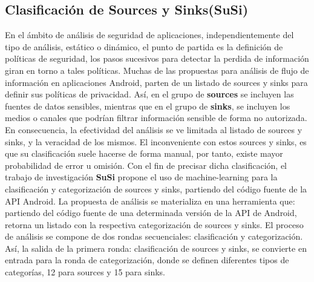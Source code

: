 \subsection{Clasificación de Sources y Sinks(SuSi)}
\label{sec:susi}
En el ámbito de análisis de seguridad de aplicaciones, independientemente del
tipo de análisis, estático o dinámico, el punto de partida es la definición de
políticas de seguridad, los pasos sucesivos para detectar la perdida de
información giran en torno a tales políticas.\newline
Muchas de las propuestas para análisis de flujo de información en aplicaciones
Android, parten de un listado de sources y sinks para definir sus políticas de
privacidad. Así, en el grupo de \textbf{sources} se incluyen las fuentes de
datos sensibles, mientras que en el grupo de \textbf{sinks}, se incluyen los
medios o canales que podrían filtrar información sensible de forma no autorizada. 
En consecuencia, la efectividad del análisis se ve limitada al listado de
sources y sinks, y la veracidad de los mismos. El inconveniente con estos sources y sinks, es que su
clasificación suele hacerse de forma manual, por tanto, existe mayor
probabilidad de error u omisión.\newline
Con el fin de precisar dicha clasificación, el trabajo de investigación
\textbf{SuSi} propone el uso de machine-learning para la clasificación y
categorización de sources y sinks, partiendo del código fuente de la API Android.
La propuesta de análisis se materializa en una herramienta que: partiendo del
código fuente de una determinada versión de la API de Android, retorna un
listado con la respectiva categorización de sources y sinks.\newline
El proceso de análisis se compone de dos rondas secuenciales: clasificación y
categorización.\newline
Así, la salida de la primera ronda: clasificación de sources y sinks, se
convierte en entrada para la ronda de categorización, donde se definen
diferentes tipos de categorías, 12 para sources y 15 para sinks.

